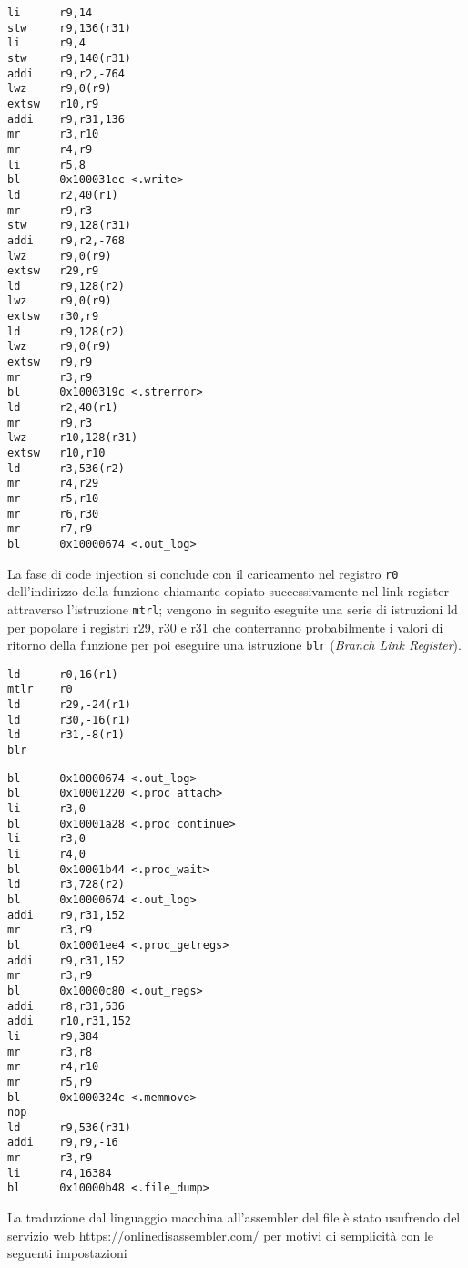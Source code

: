 \documentclass[10pt,a4paper, titlepage]{report}
\begin{document}
\begin{lstlisting}
li      r9,14
stw     r9,136(r31)
li      r9,4
stw     r9,140(r31)
addi    r9,r2,-764
lwz     r9,0(r9)
extsw   r10,r9
addi    r9,r31,136
mr      r3,r10
mr      r4,r9
li      r5,8
bl      0x100031ec <.write>
ld      r2,40(r1)
mr      r9,r3
stw     r9,128(r31)
addi    r9,r2,-768
lwz     r9,0(r9)
extsw   r29,r9
ld      r9,128(r2)
lwz     r9,0(r9)
extsw   r30,r9
ld      r9,128(r2)
lwz     r9,0(r9)
extsw   r9,r9
mr      r3,r9
bl      0x1000319c <.strerror>
ld      r2,40(r1)
mr      r9,r3
lwz     r10,128(r31)
extsw   r10,r10
ld      r3,536(r2)
mr      r4,r29
mr      r5,r10
mr      r6,r30
mr      r7,r9
bl      0x10000674 <.out_log>
\end{lstlisting}

La fase di code injection si conclude con il caricamento nel registro \texttt{r0} dell'indirizzo della funzione chiamante copiato successivamente nel link register attraverso l'istruzione \texttt{mtrl}; vengono in seguito eseguite una serie di istruzioni ld per popolare i registri r29, r30 e r31 che conterranno probabilmente i valori di ritorno della funzione per poi eseguire una istruzione \texttt{blr} (\textit{Branch Link Register}).

\begin{lstlisting}
ld      r0,16(r1)
mtlr    r0
ld      r29,-24(r1)
ld      r30,-16(r1)
ld      r31,-8(r1)
blr
\end{lstlisting}


\begin{lstlisting}
bl      0x10000674 <.out_log>
bl      0x10001220 <.proc_attach>
li      r3,0
bl      0x10001a28 <.proc_continue>
li      r3,0
li      r4,0
bl      0x10001b44 <.proc_wait>
ld      r3,728(r2)
bl      0x10000674 <.out_log>
addi    r9,r31,152
mr      r3,r9
bl      0x10001ee4 <.proc_getregs>
addi    r9,r31,152
mr      r3,r9
bl      0x10000c80 <.out_regs>
addi    r8,r31,536
addi    r10,r31,152
li      r9,384
mr      r3,r8
mr      r4,r10
mr      r5,r9
bl      0x1000324c <.memmove>
nop
ld      r9,536(r31)
addi    r9,r9,-16
mr      r3,r9
li      r4,16384
bl      0x10000b48 <.file_dump>
\end{lstlisting}












La traduzione dal linguaggio macchina all'assembler del file è stato usufrendo del servizio web https://onlinedisassembler.com/ per motivi di semplicità con le seguenti impostazioni
\end{document}
